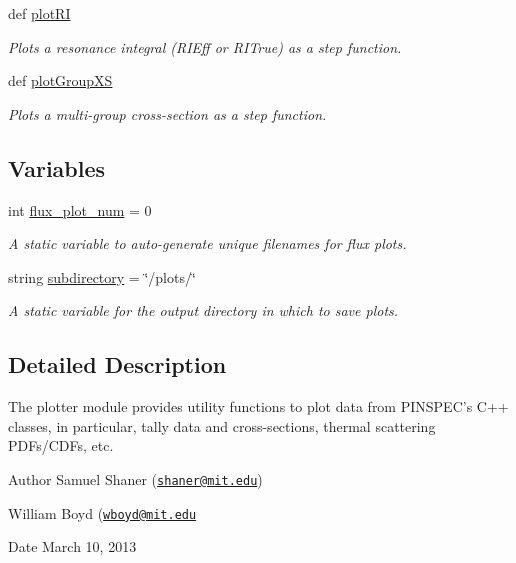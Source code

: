 \begin{DoxyCompactItemize}
def \hyperlink{namespacepinspec_1_1plotter_a00729d4934ced6d02844b7f0355b77f4}{plot\-R\-I}
\begin{DoxyCompactList}\small\item\em Plots a resonance integral (R\-I\-Eff or R\-I\-True) as a step function. \end{DoxyCompactList}\item 
def \hyperlink{namespacepinspec_1_1plotter_afa68183a802e9f9195f30f4eb8f3ae88}{plot\-Group\-X\-S}
\begin{DoxyCompactList}\small\item\em Plots a multi-\/group cross-\/section as a step function. \end{DoxyCompactList}\end{DoxyCompactItemize}
\subsection*{Variables}
\begin{DoxyCompactItemize}
\item 
\hypertarget{namespacepinspec_1_1plotter_a696ce32dd92f7b9132675df865c1ab5a}{int \hyperlink{namespacepinspec_1_1plotter_a696ce32dd92f7b9132675df865c1ab5a}{flux\-\_\-plot\-\_\-num} = 0}\label{namespacepinspec_1_1plotter_a696ce32dd92f7b9132675df865c1ab5a}

\begin{DoxyCompactList}\small\item\em A static variable to auto-\/generate unique filenames for flux plots. \end{DoxyCompactList}\item 
\hypertarget{namespacepinspec_1_1plotter_adce9f69349465ff5331b9909723b929b}{string \hyperlink{namespacepinspec_1_1plotter_adce9f69349465ff5331b9909723b929b}{subdirectory} = \char`\"{}/plots/\char`\"{}}\label{namespacepinspec_1_1plotter_adce9f69349465ff5331b9909723b929b}

\begin{DoxyCompactList}\small\item\em A static variable for the output directory in which to save plots. \end{DoxyCompactList}\end{DoxyCompactItemize}


\subsection{Detailed Description}
The plotter module provides utility functions to plot data from P\-I\-N\-S\-P\-E\-C's C++ classes, in particular, tally data and cross-\/sections, thermal scattering P\-D\-Fs/\-C\-D\-Fs, etc. \begin{DoxyAuthor}{Author}
Samuel Shaner (\href{mailto:shaner@mit.edu}{\tt shaner@mit.\-edu}) 

William Boyd (\href{mailto:wboyd@mit.edu}{\tt wboyd@mit.\-edu} 
\end{DoxyAuthor}
\begin{DoxyDate}{Date}
March 10, 2013 
\end{DoxyDate}



